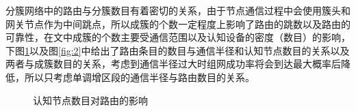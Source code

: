 \documentclass[a4paper,AutoFakeBold,oneside,12pt]{book}
\begin{document}
  分簇网络中的路由与分簇数目有着密切的关系，由于节点通信过程中会使用簇头和网关节点作为中间跳点，所以成簇的个数一定程度上影响了路由的跳数以及路由的可靠性，在文中成簇的个数主要受通信范围以及认知设备的密度（数目）的影响，下图\ref{fig:1}以及图\ref{fig:2}中给出了路由条目的数目与通信半径和认知节点数目的关系以及两者与成簇数目的关系，考虑到通信半径过大时组网成功率将会到达最大概率后降低，所以只考虑单调增区段的通信半径与路由数目的关系。
 \begin{figure}[htbp]
\centering  
  \caption{认知节点数目对路由的影响}  
  \label{fig:1}                                                        \end{figure}
\end{document}
